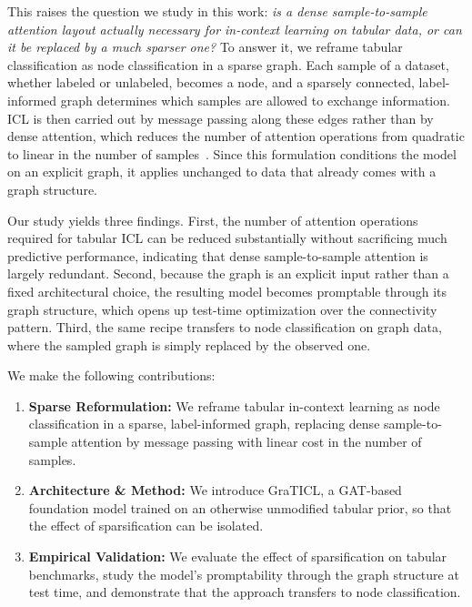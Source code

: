 \documentclass{article} %
\begin{document}
This raises the question we study in this work: \emph{is a dense sample-to-sample attention layout actually necessary for in-context learning on tabular data, or can it be replaced by a much sparser one?} To answer it, we reframe tabular classification as node classification in a sparse graph. Each sample of a dataset, whether labeled or unlabeled, becomes a node, and a sparsely connected, label-informed graph determines which samples are allowed to exchange information. ICL is then carried out by message passing along these edges rather than by dense attention, which reduces the number of attention operations from quadratic to linear in the number of samples~\citep{gilmer2017neural_msg_passing}. Since this formulation conditions the model on an explicit graph, it applies unchanged to data that already comes with a graph structure.

Our study yields three findings. First, the number of attention operations required for tabular ICL can be reduced substantially without sacrificing much predictive performance, indicating that dense sample-to-sample attention is largely redundant. Second, because the graph is an explicit input rather than a fixed architectural choice, the resulting model becomes promptable through its graph structure, which opens up test-time optimization over the connectivity pattern. Third, the same recipe transfers to node classification on graph data, where the sampled graph is simply replaced by the observed one.

We make the following contributions:

\begin{enumerate}
    \item \textbf{Sparse Reformulation:} We reframe tabular in-context learning as node classification in a sparse, label-informed graph, replacing dense sample-to-sample attention by message passing with linear cost in the number of samples.

    \item \textbf{Architecture \& Method:} We introduce GraTICL, a GAT-based foundation model trained on an otherwise unmodified tabular prior, so that the effect of sparsification can be isolated.

    \item \textbf{Empirical Validation:} We evaluate the effect of sparsification on tabular benchmarks, study the model's promptability through the graph structure at test time, and demonstrate that the approach transfers to node classification.
\end{enumerate}
\end{document}
